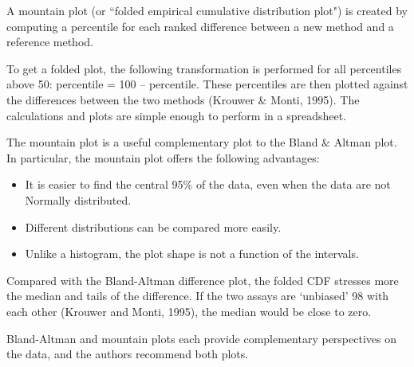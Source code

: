 \documentclass[Chap2bmain.tex]{subfiles}
\begin{document}


A mountain plot (or ``folded empirical cumulative distribution plot") is created by computing a percentile for each ranked difference between a new method and a reference method. 

To get a folded plot, the following transformation is performed for all percentiles above 50: 
percentile = 100 – percentile. These percentiles are then plotted against the differences between 
the two methods (Krouwer \& Monti, 1995). The calculations and plots are simple enough to perform in a spreadsheet. 

The mountain plot is a useful complementary plot to the Bland \& Altman plot. 
In particular, the mountain plot offers the following advantages:
\begin{itemize}
\item It is easier to find the central 95\% of the data, even when the data are not Normally distributed.
\item Different distributions can be compared more easily.
\item Unlike a histogram, the plot shape is not a function of the intervals. 
\end{itemize}


Compared with the Bland-Altman difference plot, the folded CDF stresses more the median and tails of the difference. 
If the two assays are ‘unbiased’ 98 with each other (Krouwer and Monti, 1995), the median would be close to zero. 



Bland-Altman and mountain plots each provide complementary perspectives on the data, and the authors recommend both plots.




\end{document}
